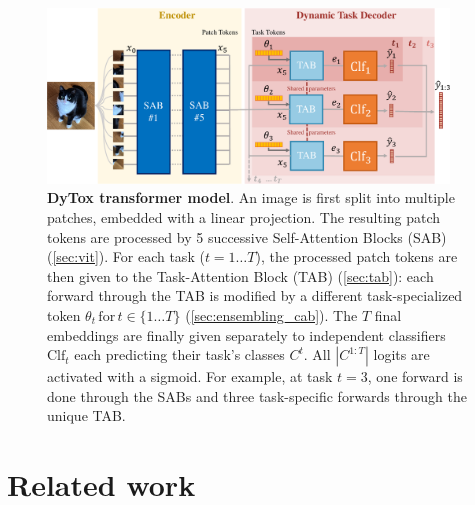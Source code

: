 \begin{figure}
    \centering
    \includegraphics[width=0.95\textwidth]{images/dytox/dytox.pdf}
    \caption{\textbf{DyTox transformer model}. An image is first split into multiple patches,
    embedded with a linear projection. The resulting patch tokens are processed by 5 successive
    Self-Attention Blocks (SAB) (\autoref{sec:vit}). For each task ($t = 1\dots T$), the processed
    patch tokens are then given to the Task-Attention Block (TAB) (\autoref{sec:tab}): each forward
    through the TAB is modified by a different task-specialized token $\theta_t\, \text{for}\, t \in
        \{1 \dots T\}$ (\autoref{sec:ensembling_cab}). The $T$ final embeddings are finally given
    separately to independent classifiers $\text{Clf}_t$ each predicting their task's classes $C^t$.
    All $|C^{1:T}|$ logits are activated with a sigmoid. For example, at task $t=3$, one forward is
    done through the SABs and three task-specific forwards through the unique TAB.}
    \label{fig:dytox_model}
\end{figure}


\section{Related work}
\label{sec:dytox_related}


